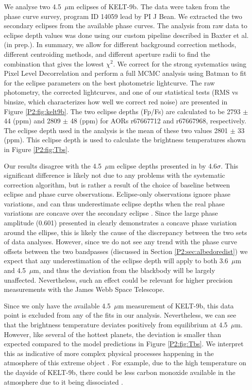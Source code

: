 \begin{subappendices}
We analyse two 4.5~$\mu$m eclipses of KELT-9b. The data were taken from the phase curve survey,   program ID 14059 lead by PI J Bean. We extracted the two secondary eclipses from the available phase curves. The analysis from raw data to eclipse depth values was done using our custom pipeline described in Baxter et al. (in prep.). In summary, we allow for different background correction methods, different centroiding methods, and different aperture radii to find the combination that gives the lowest $\chi^2$. We correct for the strong \spitzer systematics using Pixel Level Decorrelation \citep{Deming2015} and perform a full MCMC analysis using Batman \citep{Kreidberg2015} to fit for the eclipse parameters on the best photometric lightcurve. The raw photometry, the corrected lightcurves, and one of our statistical tests (RMS vs binsize, which characterizes how well we correct red noise) are  presented in Figure \ref{P2:fig:kelt9b}. The two eclipse depths (Fp/Fs) are calculated to be 2793 $\pm$ 44 (ppm) and 2809 $\pm$ 48 (ppm) for AORs r67667712 and r67667968, respectively. The eclipse depth used in the analysis is the mean of these two values 2801 $\pm$ 33 (ppm). This eclipse depth is used to calculate the brightness temperatures shown in Figure \ref{P2:fig:Tbs}.

Our results disagree with the 4.5~$\mu$m eclipse depths presented in \citet{Mansfield2020} by 4.6$\sigma$. This significant difference is likely not due to any problems with the systematic correction algorithm, but is rather a result of the choice of baseline between eclipse and phase curve observations. Eclipse-only observations ignore phase variations, and can thus underestimate eclipse depths when the real phase variations are concave over the secondary eclipse \citep[e.g.,][]{Bell2019}. Since the large phase amplitude (0.601) presented in \citet{Mansfield2020} clearly demonstrates a concave phase variation around the ellipse, this is likely the cause of the discrepancy between the two sets of data analyses. However, since we do not see any trend with the phase curve offsets between the two \spitzer bandpasses (discussed in Section \ref{P2:sec:albedoredist}) we expect that any underestimation of the eclipse depth will apply to both 3.6~$\mu$m and 4.5~$\mu$m, and thus the deviation from the blackbody will be largely unaffected. Nevertheless, such an effect could be relevant for higher precision measurements with the James Webb Space Telescope.

Since we only have the available 4.5~$\mu$m measurement of KELT-9b, this data point is excluded from any of the fits in our analysis. Nevertheless, we can see that the brightness temperature deviates positively from equilibrium at 4.5~$\mu$m. However, like several of the hottest planets, the deviation is smaller than expected compared to the model predictions in Figure \ref{P2:fig:Tbs}. We interpret this as indicative of more complex physical processes happening in the atmosphere of this extreme object \citep{Bell2018, Komacek2018b, Lothringer2018, Kitzmann2018, Mansfield2020}. For example, due to the high temperature on the dayside of KELT-9b, there could be less carbon monoxide available in the atmosphere due to it being dissociated \citep{Kitzmann2018}.



\end{subappendices}
